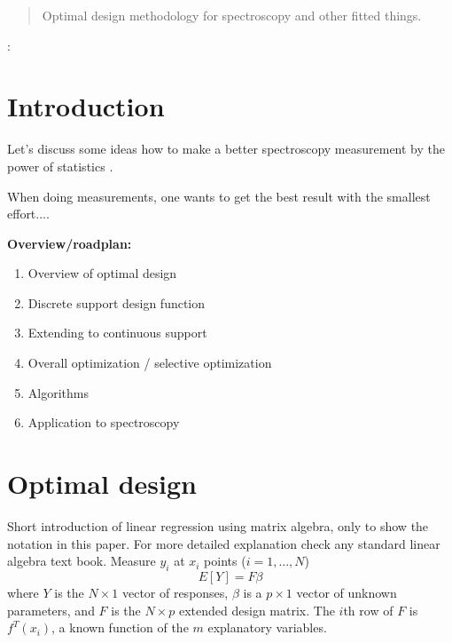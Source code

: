 \documentclass[12pt]{iopart}
\begin{document}
\address{Institute of Atomic and Molecular Sciences, Academia Sinica, Taiwan}
\begin{abstract}
Optimal design methodology for spectroscopy and other fitted things.
\end{abstract}

:

\pacs{}
\submitto{\MST}

\section{Introduction}



Let's discuss some ideas how to make a better spectroscopy measurement by the power of statistics \cite{Atkinson1992}.

When doing measurements, one wants to get the best result with the smallest effort....




\textbf{Overview/roadplan:}
\begin{enumerate}
\item Overview of optimal design
\item Discrete support design function
\item Extending to continuous support
\item Overall optimization / selective optimization
\item Algorithms
\item Application to spectroscopy
\end{enumerate}

\section{Optimal design}
Short introduction of linear regression using matrix algebra, only to show the notation in this paper. For more detailed explanation check any standard linear algebra text book. Measure $y_i$ at $x_i$ points ($i=1, \ldots, N$)
\begin{equation}
E[Y] = F \beta 
\end{equation}
where $Y$ is the $N \times 1$ vector of responses, $\beta$ is a $p \times 1$ vector of unknown parameters, and $F$ is the $N \times p$ extended design matrix. The $i$th row of $F$ is $f^T(x_i)$, a known function of the $m$ explanatory variables.
\end{document}
